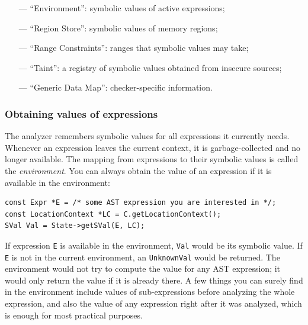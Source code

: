 \documentclass[a4paper,12pt]{article}
\newenvironment{nobr}{\begin{minipage}{\textwidth}\setlength\parskip{1em}
}{\end{minipage}\ignorespacesafterend}
\begin{document}
\begin{itemize}
\item[---]``Environment'': symbolic values of active expressions;
\item[---]``Region Store'': symbolic values of memory regions;
\item[---]``Range Constraints'': ranges that symbolic values may take;
\item[---]``Taint'': a registry of symbolic values obtained from insecure sources;
\item[---]``Generic Data Map'': checker-specific information.
\end{itemize}

\begin{nobr}
\subsubsection{Obtaining values of expressions}

The analyzer remembers symbolic values for all expressions it currently needs. Whenever an expression leaves the current context, it is garbage-collected and no longer available. The mapping from expressions to their symbolic values is called the \emph{environment}. You can always obtain the value of an expression if it is available in the environment:

\begin{lstlisting}[style=cplusplus,numbers=none]
const Expr *E = /* some AST expression you are interested in */;
const LocationContext *LC = C.getLocationContext();
SVal Val = State->getSVal(E, LC);
\end{lstlisting}
\end{nobr}

If expression \lstinline|E| is available in the environment, \lstinline|Val| would be its symbolic value. If \lstinline|E| is not in the current environment, an \lstinline|UnknownVal| would be returned. The environment would not try to compute the value for any AST expression; it would only return the value if it is already there. A few things you can surely find in the environment include values of sub-expressions before analyzing the whole expression, and also the value of any expression right after it was analyzed, which is enough for most practical purposes.
\end{document}
